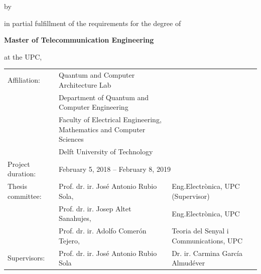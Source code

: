 \begin{titlepage}
\begin{center}
{\makeatletter
\titlestyle\color{tudelft-cyan}\Huge\@title
\makeatother}

{\makeatletter
\ifx\@subtitle\undefined\else
    \bigskip
    \titlefont\titleshape\LARGE\@subtitle
\fi
\makeatother}

\bigskip
\bigskip

by

\bigskip
\bigskip

{\makeatletter
\titlefont\Large\@author
\makeatother}

\bigskip
\bigskip

in partial fulfillment of the requirements for the degree of

\bigskip
\bigskip

{\bfseries Master of Telecommunication Engineering}

\bigskip
\bigskip

at the UPC,


\vfill

\begin{tabular}{p{3cm}p{7.5cm}p{5cm}}
    Affiliation: & Quantum and Computer Architecture Lab &\\
                & Department of Quantum and Computer Engineering &\\
                & Faculty of Electrical Engineering, Mathematics and Computer Sciences &\\
                & Delft University of Technology &\\
    Project duration: & \multicolumn{2}{l}{February 5, 2018 -- February 8, 2019} \\
    Thesis committee:   & Prof. dr. ir. José Antonio Rubio Sola, & Eng.Electrònica, UPC (Supervisor)\\
                        & Prof. dr. ir. Josep Altet Sanahujes, & Eng.Electrònica, UPC \\
                        & Prof. dr. ir. Adolfo Comerón Tejero, & Teoria del Senyal i Communications, UPC\\
    Supervisors: & Prof. dr. ir. José Antonio Rubio Sola & Dr. ir. Carmina García Almudéver
       
\end{tabular}


\bigskip
\bigskip

\end{center}

\end{titlepage}

